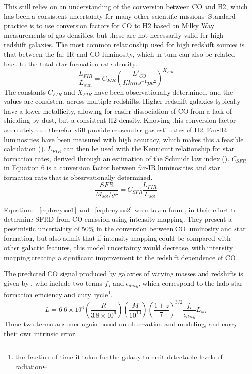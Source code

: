 \documentclass[manuscript]{aastex}
\begin{document}
This still relies on an understanding of the conversion between CO and H2, which has been a consistent uncertainty for many other scientific missions. Standard practice is to use conversion factors for CO to H2 based on Milky Way measurements of gas densities, but these are not necessarily valid for high-redshift galaxies. The most common relationship used for high redshift sources is that between the far-IR and CO luminosity, which in turn can also be related back to the total star formation rate density. 
\begin{equation}\label{eq:breysse1}
\frac{L_{FIR}}{L_{sun}} = C_{FIR}(\frac{L'_{CO}}{K km s^{-1} pc^{2}})^{X_{FIR}}
\end{equation}
The constants $C_{FIR}$ and $X_{FIR}$ have been observationally determined, and the values are consistent across multiple redshifts. Higher redshift galaxies typically have a lower metallicity, allowing for easier dissociation of CO from a lack of shielding by dust, but a consistent H2 density. Knowing this conversion factor accurately can therefor still provide reasonable gas estimates of H2.  Far-IR luminosities have been measured with high accuracy, which makes this a feasible calculation (\cite{Carilli2013}).  $L_{FIR}$ can then be used with the Kennicutt relationship for star formation rates, derived through an estimation of the Schmidt law index (\cite{Kennicutt1998}). $C_{SFR}$ in Equation 6 is a conversion factor between far-IR luminosities and star formation rate that is observationally determined. 
\begin{equation}\label{eq:breysse2}
\frac{SFR}{M_{sol}/yr} = C_{SFR}\frac{L_{FIR}}{L_{sol}}
\end{equation}

Equations ~\ref{eq:breysse1} and ~\ref{eq:breysse2} were taken from \cite{Breysse2016}, in their effort to determine SFRD from CO emission using intensity mapping.  They present a pessimistic uncertainty of 50\% in the conversion between CO luminosity and star formation, but also admit that if intensity mapping could be compared with other galactic features, this model uncertainty would decrease, with intensity mapping creating a significant improvement to the redshift dependence of CO.  

The predicted CO signal produced by galaxies of varying masses and redshifts is given by \cite{Visbal2010}, who include two terms  $f_{\star}$ and $\epsilon_{duty}$, which correspond to the halo star formation efficiency and 
duty cycle\footnote{the fraction of time it takes for the galaxy to emit detectable levels of radiation}. 
\begin{equation}
L = 6.6\times10^{6}(\frac{R}{3.8\times10^{6}})(\frac{M}{10^{10}})(\frac{1+z}{7})^{3/2} \frac{f_{\star}}{\epsilon_{duty}} L_{sol}
\end{equation}
These two terms are once again based on observation and modeling, and carry their own intrinsic error. 
\end{document}
